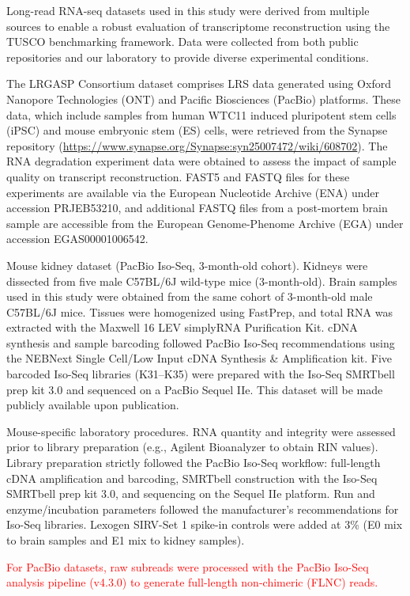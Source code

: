 \documentclass[pdflatex,sn-nature]{sn-jnl}%
\newcommand{\tuscoBenchmarkingFramework}{TUSCO benchmarking framework}
\begin{document}
Long-read RNA-seq datasets used in this study were derived from multiple sources to enable a robust evaluation of transcriptome reconstruction using the \tuscoBenchmarkingFramework{}. Data were collected from both public repositories and our laboratory to provide diverse experimental conditions.

The LRGASP Consortium dataset comprises LRS data generated using Oxford Nanopore Technologies (ONT) and Pacific Biosciences (PacBio) platforms. These data, which include samples from human WTC11 induced pluripotent stem cells (iPSC) and mouse embryonic stem (ES) cells, were retrieved from the Synapse repository (\url{https://www.synapse.org/Synapse:syn25007472/wiki/608702}). The RNA degradation experiment data were obtained to assess the impact of sample quality on transcript reconstruction. FAST5 and FASTQ files for these experiments are available via the European Nucleotide Archive (ENA) under accession PRJEB53210, and additional FASTQ files from a post-mortem brain sample are accessible from the European Genome-Phenome Archive (EGA) under accession EGAS00001006542.

Mouse kidney dataset (PacBio Iso-Seq, 3-month-old cohort). Kidneys were dissected from five male C57BL/6J wild-type mice (3-month-old). Brain samples used in this study were obtained from the same cohort of 3-month-old male C57BL/6J mice. Tissues were homogenized using FastPrep, and total RNA was extracted with the Maxwell 16 LEV simplyRNA Purification Kit. cDNA synthesis and sample barcoding followed PacBio Iso-Seq recommendations using the NEBNext Single Cell/Low Input cDNA Synthesis \& Amplification kit. Five barcoded Iso-Seq libraries (K31--K35) were prepared with the Iso-Seq SMRTbell prep kit 3.0 and sequenced on a PacBio Sequel IIe. This dataset will be made publicly available upon publication.

Mouse-specific laboratory procedures. RNA quantity and integrity were assessed prior to library preparation (e.g., Agilent Bioanalyzer to obtain RIN values). Library preparation strictly followed the PacBio Iso-Seq workflow: full-length cDNA amplification and barcoding, SMRTbell construction with the Iso-Seq SMRTbell prep kit 3.0, and sequencing on the Sequel IIe platform. Run and enzyme/incubation parameters followed the manufacturer's recommendations for Iso-Seq libraries. Lexogen SIRV-Set 1 spike-in controls were added at 3\% (E0 mix to brain samples and E1 mix to kidney samples).

\textcolor{red}{For PacBio datasets, raw subreads were processed with the PacBio Iso-Seq analysis pipeline (v4.3.0) to generate full-length non-chimeric (FLNC) reads.}
\end{document}
